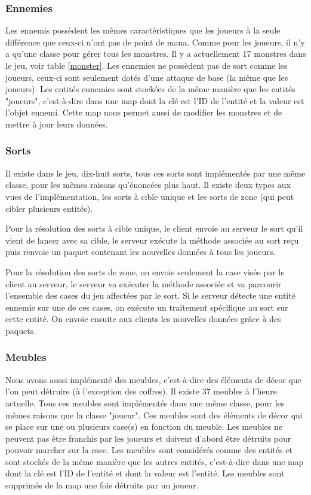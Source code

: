 \documentclass[a4paper, 12pt, twoside]{article}
\begin{document}
\subsubsection{Ennemies}
Les ennemis possèdent les mêmes caractéristiques que les joueurs à la seule différence que ceux-ci n'ont pas de point de mana. Comme pour les joueurs, il n'y a qu'une classe pour gérer tous les monstres. Il y a actuellement 17 monstres dans le jeu, voir table \ref{monster}. Les ennemies ne possèdent pas de sort comme les joueurs, ceux-ci sont seulement dotés d'une attaque de base (la même que les joueurs). Les entités ennemies sont stockées de la même manière que les entités "joueurs", c'est-à-dire dans une map dont la clé est l'ID de l'entité et la valeur est l'objet ennemi. Cette map nous permet aussi de modifier les monstres et de mettre à jour leurs données.

\subsubsection{Sorts}
Il existe dans le jeu, dix-huit sorts, tous ces sorts sont implémentés par une même classe, pour les mêmes raisons qu'énoncées plus haut. Il existe deux types aux vues de l'implémentation, les sorts à cible unique et les sorts de zone (qui peut cibler plusieurs entités). \par
Pour la résolution des sorts à cible unique, le client envoie au serveur le sort qu'il vient de lancer avec sa cible, le serveur exécute la méthode associée au sort reçu puis renvoie un paquet contenant les nouvelles données à tous les joueurs. \par
Pour la résolution des sorts de zone, on envoie seulement la case visée par le client au serveur, le serveur va exécuter la méthode associée et va parcourir l'ensemble des cases du jeu affectées par le sort. Si le serveur détecte une entité ennemie sur une de ces cases, on exécute un traitement spécifique au sort sur cette entité. On envoie ensuite aux clients les nouvelles données grâce à des paquets.

\subsubsection{Meubles}
Nous avons aussi implémenté des meubles, c'est-à-dire des éléments de décor que l'on peut détruire (à l'exception des coffres). Il existe 37 meubles à l'heure actuelle. Tous ces meubles sont implémentés dans une même classe, pour les mêmes raisons que la classe "joueur". Ces meubles sont des éléments de décor qui se place sur une ou plusieurs case(s) en fonction du meuble. Les meubles ne peuvent pas être franchis par les joueurs et doivent d'abord être détruits pour pouvoir marcher sur la case. Les meubles sont considérés comme des entités et sont stockés de la même manière que les autres entités, c'est-à-dire dans une map dont la clé est l'ID de l'entité et dont la valeur est l'entité. Les meubles sont supprimés de la map une fois détruits par un joueur.  \par
\end{document}
